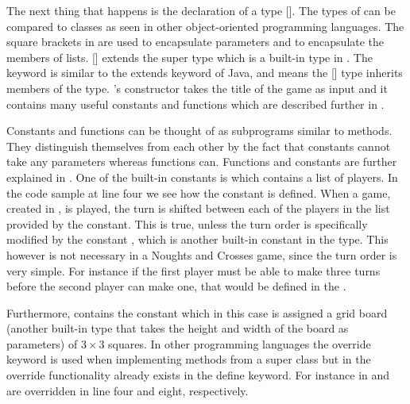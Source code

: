 The next thing that happens is the declaration of a type 
[].  The types of \productname{} can be compared to classes as
seen in other object-oriented programming languages. The square brackets in
\productname{} are used to encapsulate parameters and to encapsulate the members
of lists.   [] extends the super type 
which is a built-in type in \productname{}. The  keyword is
similar to the extends keyword of Java, and means the [] type
inherits members of the  type.  's constructor takes the
title of the game as input and it contains many useful constants and
functions which are described further in . 

Constants and functions can be thought of as subprograms similar to methods.
They distinguish themselves from each other by the fact that constants cannot
take any parameters whereas functions can. Functions and constants are further
explained in . One of the built-in constants is
 which contains a list of players. In the code sample at line
four we see how the constant is defined. When a game, created in
\productname{}, is played, the turn is shifted between each of the players in
the list provided by the  constant. This is true, unless the turn
order is specifically modified by the constant , which is
another built-in constant in the  type. This however is not necessary
in a Noughts and Crosses game, since the turn order is very simple. For instance
if the first player must be able to make three turns before the second player
can make one, that would be defined in the .

Furthermore,  contains the constant  which in
this case is assigned a grid board (another built-in type that takes the height
and width of the board as parameters) of $3 \times 3$ squares. In other
programming languages the override keyword is used when implementing methods
from a super class but in \productname{} the override functionality
already exists in the define keyword. For instance in
  and  are
overridden in line four and eight, respectively.


